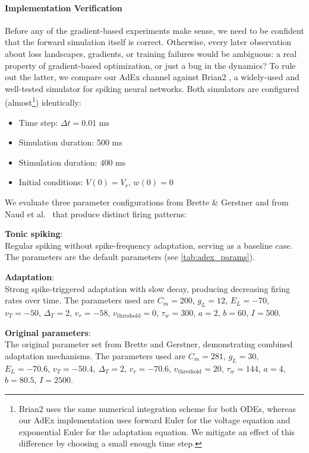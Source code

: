 \paragraph{Implementation Verification}\label{sec:method:adex:verification}
Before any of the gradient-based experiments make sense, we need to be confident that the forward simulation itself is correct.
Otherwise, every later observation about loss landscapes, gradients, or training failures would be ambiguous: a real property of gradient-based optimization, or just a bug in the dynamics?
To rule out the latter, we compare our \gls{AdEx} channel against Brian2 \cite{Stimberg2019}, a widely-used and well-tested simulator for spiking neural networks.
Both simulators are configured (almost\footnote{Brian2 uses the same numerical integration scheme for both ODEs, whereas our AdEx implementation uses forward Euler for the voltage equation and exponential Euler for the adaptation equation. We mitigate an effect of this difference by choosing a small enough time step.}) identically:
\begin{itemize}
    \item Time step: $\Delta t = 0.01$ ms
    \item Simulation duration: 500 ms
    \item Stimulation duration: 400 ms
    \item Initial conditions: $V(0) = V_r$, $w(0) = 0$
\end{itemize}

We evaluate three parameter configurations from Brette \& Gerstner \cite{Brette2005} and from Naud et al.\ \cite{Naud2008} that produce distinct firing patterns:

\textbf{Tonic spiking}:\\
Regular spiking without spike-frequency adaptation, serving as a baseline case.
The parameters are the default parameters (see \cref{tab:adex_params}).

\textbf{Adaptation}:\\
Strong spike-triggered adaptation with slow decay, producing decreasing firing rates over time.
The parameters used are
$C_m = 200$,
$g_L = 12$,
$E_L = -70$,
$v_T = -50$,
$\Delta_T = 2$,
$v_r = -58$,
$v_{\text{threshold}} = 0$,
$\tau_w = 300$,
$a = 2$,
$b = 60$,
$I = 500$.

\textbf{Original parameters}:\\
The original parameter set from Brette and Gerstner, demonstrating combined adaptation mechanisms.
The parameters used are
$C_m = 281$,
$g_L = 30$,
$E_L = -70.6$,
$v_T = -50.4$,
$\Delta_T = 2$,
$v_r = -70.6$,
$v_{\text{threshold}} = 20$,
$\tau_w = 144$,
$a = 4$,
$b = 80.5$,
$I = 2500$.

